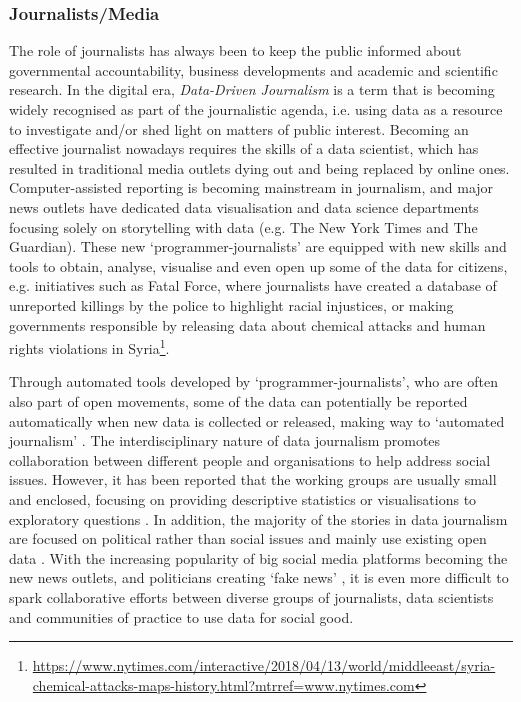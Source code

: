\subsubsection{Journalists/Media}
The role of journalists has always been to keep the public informed about governmental accountability, business developments and academic and scientific research. In the digital era, \textit{Data-Driven Journalism} \citep{ausserhofer_datafication_2017} is a term that is becoming widely recognised as part of the journalistic agenda, i.e. using data as a resource to investigate and/or shed light on matters of public interest. Becoming an effective journalist nowadays requires the skills of a data scientist, which has resulted in traditional media outlets dying out and being replaced by online ones. Computer-assisted reporting is becoming mainstream in journalism, and major news outlets have dedicated data visualisation and data science departments focusing solely on storytelling with data (e.g. The New York Times and The Guardian). These new `programmer-journalists' \citep{parasie_data-driven_2013} are equipped with new skills and tools to obtain, analyse, visualise and even open up some of the data for citizens, e.g. initiatives such as Fatal Force, where journalists have created a database of unreported killings by the police to highlight racial injustices, or making governments responsible by releasing data about chemical attacks and human rights violations in Syria\footnote{\url{https://www.nytimes.com/interactive/2018/04/13/world/middleeast/syria-chemical-attacks-maps-history.html?mtrref=www.nytimes.com}}.

Through automated tools developed by `programmer-journalists', who are often also part of open movements, some of the data can potentially be reported automatically when new data is collected or released, making way to `automated journalism' \citep[ch. 27]{davies_state_2019}. The interdisciplinary nature of data journalism promotes collaboration between different people and organisations to help address social issues. However, it has been reported that the working groups are usually small and enclosed, focusing on providing descriptive statistics or visualisations to exploratory questions \citep{choi_characteristics_2017}. In addition, the majority of the stories in data journalism are focused on political rather than social issues and mainly use existing open data \citep{loosen_data-driven_2017}. With the increasing popularity of big social media platforms becoming the new news outlets, and politicians creating `fake news' \citep{carson_fake_2017}, it is even more difficult to spark collaborative efforts between diverse groups of journalists, data scientists and communities of practice to use data for social good.

